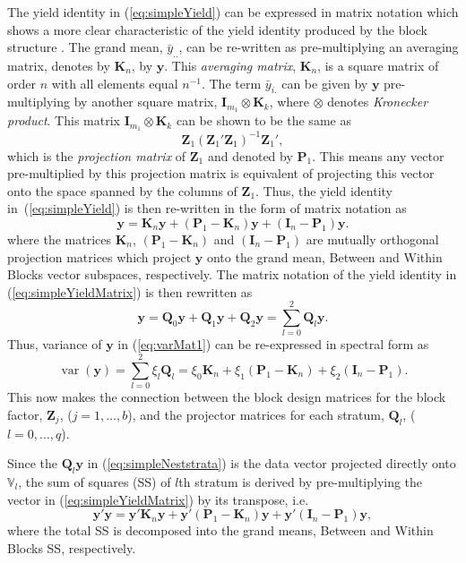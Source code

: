 \documentclass[article]{jss}
\newcommand{\mP}{\mathbf{P}}
\newcommand{\I}{\mathbf{I}}
\newcommand{\K}{\mathbf{K}}
\newcommand{\Z}{\mathbf{Z}}
\newcommand{\Q}{\mathbf{Q}}
\begin{document}
The yield identity in (\ref{eq:simpleYield}) can be expressed in matrix notation which shows a more clear characteristic of the yield identity produced by the block structure \citep{Nelder1965A}. The grand mean, $\bar{y}_{..}$, can be re-written as pre-multiplying an averaging matrix, denotes by $\K_{n}$, by $\bm{y}$. This \emph{averaging matrix}, $\K_{n}$, is a square matrix of order $n$ with all elements equal ${n}^{-1}$. The term $\bar{y}_{i.}$ can be given by $\bm{y}$ pre-multiplying by another square matrix, $\I_{m_1} \otimes \K_{k}$, where $\otimes$ denotes \emph{Kronecker product}. This matrix $\I_{m_1} \otimes \K_{k}$ can be shown to be the same as 
\[ 
\Z_{1}(\Z_{1}'\Z_{1})^{-1}\Z_{1}',
\] 
which is the \emph{projection matrix} of $\Z_{1}$ and denoted by $\mP_{1}$. This means any vector pre-multiplied by this projection matrix is equivalent of projecting this vector onto the space spanned by the columns of $\Z_{1}$. Thus, the yield identity in~(\ref{eq:simpleYield}) is then re-written in the form of matrix notation as 
\begin{equation}\label{eq:simpleYieldMatrix}
\bm{y} = \K_{n}\bm{y} + (\mP_{1} - \K_{n})\bm{y} + (\I_{n} - \mP_{1})\bm{y}.
\end{equation}
where the matrices $\K_{n}$, $(\mP_{1}-\K_{n})$ and $(\I_{n} - \mP_{1})$ are mutually orthogonal projection matrices which project $\bm{y}$ onto the grand mean, Between and Within Blocks vector subspaces, respectively. The matrix notation of the yield identity in (\ref{eq:simpleYieldMatrix}) is then rewritten as 
\begin{equation}\label{eq:simpleNeststrata}
\bm{y} = \Q_{0}\bm{y} + \Q_{1}\bm{y} + \Q_{2}\bm{y} = \sum_{l=0}^{2} \Q_l \bm{y}.
\end{equation}
Thus, variance of $\bm{y}$ in (\ref{eq:varMat1}) can be re-expressed in spectral form as  
\begin{equation}
\label{eq:strata1}
\operatorname{var}(\bm{y}) = \sum_{l=0}^{2} \xi_l \Q_l = \xi_0\K_{n} + \xi_1(\mP_{1} - \K_{n}) + \xi_2(\I_{n} - \mP_{1}).
\end{equation}
This now makes the connection between the block design matrices for the block factor, $\Z_{j}$, ($j = 1, \dots, b$), and the projector matrices for each stratum, $\Q_{l}$, ($l = 0,\dots, q$).

Since the $\Q_l \bm{y}$ in (\ref{eq:simpleNeststrata}) is the data vector projected directly onto $\mathbb{V}_l$, the sum of squares (SS) of $l$th stratum is derived by pre-multiplying the vector in (\ref{eq:simpleYieldMatrix}) by its transpose, i.e.\
\begin{equation}
\label{eq:infoDecomp1}
\bm{y}'\bm{y} = \bm{y}'\K_n\bm{y} + \bm{y}'(\mP_{1}-\K_n)\bm{y} + \bm{y}'(\I_n - \mP_{1})\bm{y},
\end{equation}
where the total SS is decomposed into the grand means, Between and Within Blocks SS, respectively.
\end{document}
